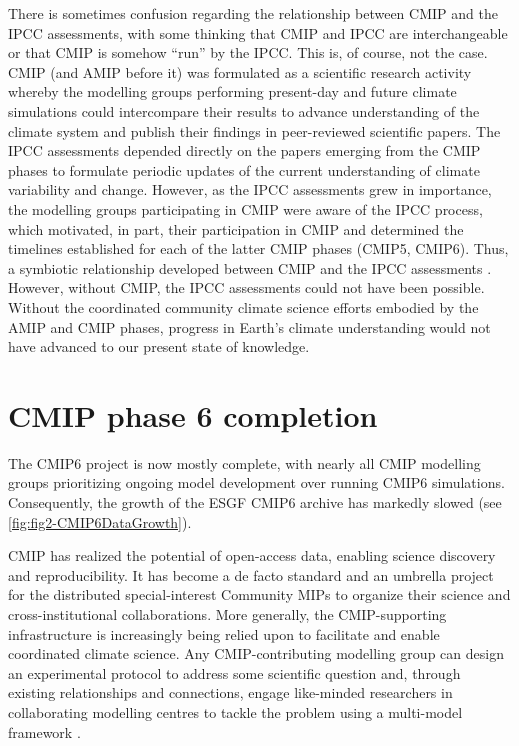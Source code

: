 \documentclass[manuscript]{copernicus}
\newcommand{\mycomment}[1]{}
\begin{document}
There is sometimes confusion regarding the relationship between CMIP and the IPCC assessments, with some thinking that CMIP and IPCC are interchangeable or that CMIP is somehow ``run'' by the IPCC. This is, of course, not the case. CMIP (and AMIP before it) was formulated as a scientific research activity whereby the modelling groups performing present-day and future climate simulations could intercompare their results to advance understanding of the climate system and publish their findings in peer-reviewed scientific papers. The IPCC assessments depended directly on the papers emerging from the CMIP phases to formulate periodic updates of the current understanding of climate variability and change. However, as the IPCC assessments grew in importance, the modelling groups participating in CMIP were aware of the IPCC process, which motivated, in part, their participation in CMIP and determined the timelines established for each of the latter CMIP phases (CMIP5, CMIP6). Thus, a symbiotic relationship developed between CMIP and the IPCC assessments \citep{meehl_role_2023}. However, without CMIP, the IPCC assessments could not have been possible. Without the coordinated community climate science efforts embodied by the AMIP and CMIP phases, progress in Earth's climate understanding would not have advanced to our present state of knowledge.

\mycomment{
CMIP6 30 data nodes publishing data, 9 reporting download statistics
CMIP5 $\sim$35 data nodes publishing, 7 reporting download statistics (all CMIP6 data nodes)
}


\section{CMIP phase 6 completion}
\label{sec:CMIP6Completion}

The CMIP6 project is now mostly complete, with nearly all CMIP modelling groups prioritizing ongoing model development over running CMIP6 simulations. Consequently, the growth of the ESGF CMIP6 archive has markedly slowed (see \autoref{fig:fig2-CMIP6DataGrowth}).

CMIP has realized the potential of open-access data, enabling science discovery and reproducibility. It has become a de facto standard and an umbrella project for the distributed special-interest Community MIPs to organize their science and cross-institutional collaborations. More generally, the CMIP-supporting infrastructure is increasingly being relied upon to facilitate and enable coordinated climate science. Any CMIP-contributing modelling group can design an experimental protocol to address some scientific question and, through existing relationships and connections, engage like-minded researchers in collaborating modelling centres to tackle the problem using a multi-model framework \citep[e.g.][]{jones_bringing_2024}.
\end{document}
